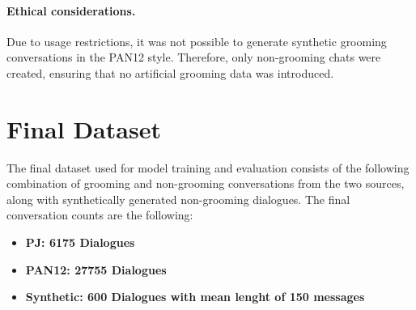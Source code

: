 \paragraph{Ethical considerations.}
Due to usage restrictions, it was not possible to generate synthetic grooming conversations in the PAN12 style. Therefore, only non-grooming chats were created, ensuring that no artificial grooming data was introduced.


\section{Final Dataset}

The final dataset used for model training and evaluation consists of the following combination of grooming and non-grooming conversations from the two sources, along with synthetically generated non-grooming dialogues. The final conversation counts are the following:

\begin{itemize}
    \item \textbf{PJ: 6175 Dialogues}
    \item \textbf{PAN12: 27755 Dialogues}
    \item \textbf{Synthetic: 600 Dialogues with mean lenght of 150 messages}
\end{itemize}

















